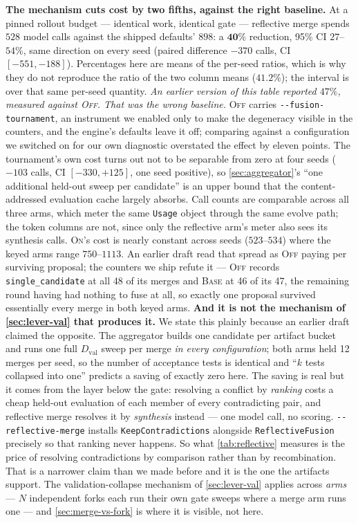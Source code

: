 \documentclass{article}
\newcommand{\code}[1]{\texttt{#1}}
\newcommand{\Dval}{D_{\mathrm{val}}}
\begin{document}
\textbf{The mechanism cuts cost by two fifths, against the right baseline.} At a pinned rollout budget --- identical work, identical gate --- reflective merge spends $528$ model calls against the shipped defaults' $898$: a $\mathbf{40\%}$ reduction, 95\% CI $27$--$54\%$, same direction on every seed (paired difference $-370$ calls, CI $[-551,-188]$). Percentages here are means of the per-seed ratios, which is why they do not reproduce the ratio of the two column means ($41.2\%$); the interval is over that same per-seed quantity. \emph{An earlier version of this table reported $47\%$, measured against \textsc{Off}. That was the wrong baseline.} \textsc{Off} carries \code{-{}-fusion-tournament}, an instrument we enabled only to make the degeneracy visible in the counters, and the engine's defaults leave it off; comparing against a configuration we switched on for our own diagnostic overstated the effect by eleven points. The tournament's own cost turns out not to be separable from zero at four seeds ($-103$ calls, CI $[-330,+125]$, one seed positive), so \cref{sec:aggregator}'s ``one additional held-out sweep per candidate'' is an upper bound that the content-addressed evaluation cache largely absorbs. Call counts are comparable across all three arms, which meter the same \code{Usage} object through the same evolve path; the token columns are not, since only the reflective arm's meter also sees its synthesis calls. \textsc{On}'s cost is nearly constant across seeds ($523$--$534$) where the keyed arms range $750$--$1113$. An earlier draft read that spread as \textsc{Off} paying per surviving proposal; the counters we ship refute it --- \textsc{Off} records \code{single\_candidate} at all 48 of its merges and \textsc{Base} at 46 of its 47, the remaining round having had nothing to fuse at all, so exactly one proposal survived essentially every merge in both keyed arms. \textbf{And it is not the mechanism of \cref{sec:lever-val} that produces it.} We state this plainly because an earlier draft claimed the opposite. The aggregator builds one candidate per artifact bucket and runs one full $\Dval$ sweep per merge \emph{in every configuration}; both arms held 12 merges per seed, so the number of acceptance tests is identical and ``$k$ tests collapsed into one'' predicts a saving of exactly zero here. The saving is real but it comes from the layer below the gate: resolving a conflict by \emph{ranking} costs a cheap held-out evaluation of each member of every contradicting pair, and reflective merge resolves it by \emph{synthesis} instead --- one model call, no scoring. \code{-{}-reflective-merge} installs \code{KeepContradictions} alongside \code{ReflectiveFusion} precisely so that ranking never happens. So what \cref{tab:reflective} measures is the price of resolving contradictions by comparison rather than by recombination. That is a narrower claim than we made before and it is the one the artifacts support. The validation-collapse mechanism of \cref{sec:lever-val} applies across \emph{arms} --- $N$ independent forks each run their own gate sweeps where a merge arm runs one --- and \cref{sec:merge-vs-fork} is where it is visible, not here.
\end{document}
